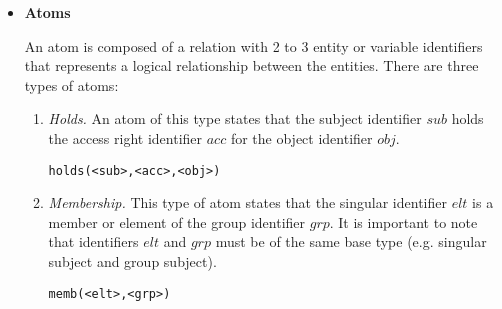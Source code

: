 \documentclass[11pt]{report}
\newenvironment{vverbatim}
{
  \begin{alltt}
}
{
    \vspace{-\baselineskip}
  \end{alltt}
}
\begin{document}
\begin{itemize}
\begin{enumerate}
              \item
                {\em Variable Identifiers} are used as place-holders for
                entity identifiers. To distinguish them from entity and
                policy update identifiers, variable identifiers are prefixed
                with an upper-case character, followed by 0 or more
                alphanumeric and underscore characters. The first character
                of a variable identifier indicates its type ("S" for
                subject, "A" for access right and "O" for object). If the
                second character is an "S", then the variable is a
                place-holder for a singular entity while a "G" indicates
                that it is a place-holder for a group entity. The following
                regular expression shows the syntax of variable identifiers:

                \begin{vverbatim}
   [SAO][SG][a-zA-Z0-9\_]
                \end{vverbatim}
            \end{enumerate}

          \item
            {\bf Atoms}

            An atom is composed of a relation with 2 to 3 entity or
            variable identifiers that represents a logical relationship
            between the entities. There are three types of atoms:

            \begin{enumerate}
              \item
                {\em Holds.} An atom of this type states that the subject
                identifier $sub$ holds the access right identifier $acc$
                for the object identifier $obj$.

               \begin{vverbatim}
  holds(<sub>, <acc>, <obj>)
               \end{vverbatim}

              \item
                {\em Membership.} This type of atom states that the
                singular identifier $elt$ is a member or element of the
                group identifier $grp$. It is important to note that
                identifiers $elt$ and $grp$ must be of the same base type
                (e.g. singular subject and group subject).

                \begin{vverbatim}
  memb(<elt>, <grp>)
                \end{vverbatim}


\end{enumerate}
\end{itemize}
\end{document}
